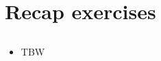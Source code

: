 \section{Recap exercises}
\subsection{}

\begin{frame}
\framesubtitleTC{}
\myPause
 \begin{itemize}[<+-| alert@+>]
 \item TBW
 \end{itemize}
\end{frame}

